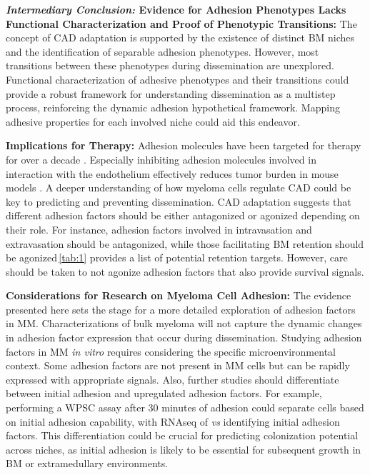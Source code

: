 \textbf{\textit{Intermediary Conclusion:} Evidence for Adhesion Phenotypes Lacks Functional Characterization and Proof of Phenotypic Transitions:}
The concept of \ac{CAD} adaptation is supported by the existence of distinct BM
niches and the identification of separable adhesion phenotypes. However, most
transitions between these phenotypes during dissemination are unexplored.
Functional characterization of adhesive phenotypes and their transitions could
provide a robust framework for understanding dissemination as a multistep
process, reinforcing the dynamic adhesion hypothetical framework. Mapping
adhesive properties for each involved niche could aid this endeavor.



\textbf{Implications for Therapy:}
Adhesion molecules have been targeted for therapy for over a decade
\cite{nairChapterSixEmerging2012, neriTargetingAdhesionMolecules2012}.
Especially inhibiting adhesion molecules involved in interaction with the
endothelium effectively reduces tumor burden in mouse models
\cite{asosinghUniquePathwayHoming2001a,
    mrozikTherapeuticTargetingNcadherin2015}. A deeper understanding of how myeloma
cells regulate \ac{CAD} could be key to predicting and preventing
dissemination. \ac{CAD} adaptation suggests that different adhesion factors
should be either antagonized or agonized depending on their role. For instance,
adhesion factors involved in intravasation and extravasation should be
antagonized, while those facilitating BM retention should be
agonized\,\textemdash\autoref{tab:1} provides a list of potential retention
targets. However, care should be taken to not agonize adhesion factors that also
provide survival signals.



\textbf{Considerations for Research on Myeloma Cell Adhesion:}
The evidence presented here sets the stage for a more detailed exploration of
adhesion factors in MM. Characterizations of bulk myeloma will not capture
the dynamic changes in adhesion factor expression that occur during dissemination.
Studying adhesion factors in MM \textit{in vitro} requires considering the
specific microenvironmental context. Some adhesion factors are not present in MM
cells but can be rapidly expressed with appropriate signals. Also, further
studies should differentiate between initial adhesion and upregulated adhesion
factors. For example, performing a \ac{WPSC} assay after 30 minutes of adhesion
could separate  cells based on initial adhesion capability, with RNAseq of
\nMAina \textit{vs} \MAina identifying initial adhesion factors. This
differentiation could be crucial for predicting colonization potential across
niches, as initial adhesion is likely to be essential for subsequent growth in
\ac{BM} or extramedullary environments.


